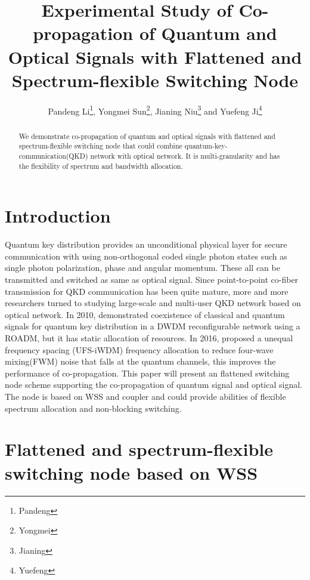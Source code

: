 \documentclass[letterpaper,10pt]{article}
\begin{document}
\title{Experimental Study of Co-propagation of Quantum and Optical Signals with Flattened and Spectrum-flexible Switching Node}
\author{Pandeng Li\thanks{Pandeng}, Yongmei Sun\thanks{Yongmei}, Jianing Niu\thanks{Jianing} and Yuefeng Ji\thanks{Yuefeng}}
\address{State Key Laboratory of Information Photonics and Optical Communications, School of Information and Telecommunication Engineering, BUPT Beijing, China, 100876}

\begin{abstract}
We demonstrate co-propagation of quantum and optical signals with flattened and spectrum-flexible switching node that could combine quantum-key-communication(QKD) network with optical network. It is multi-granularity and has the flexibility of spectrum and bandwidth allocation.
\end{abstract}

\section{Introduction}

Quantum key distribution provides an unconditional physical layer for secure communication with using non-orthogonal coded single photon states such as single photon polarization, phase and angular momentum. These all can be transmitted and switched as same as optical signal. Since point-to-point co-fiber transmission for QKD communication has been quite mature, more and more researchers turned to studying large-scale and multi-user QKD network based on optical network. In 2010, \cite{Peters} demonstrated coexistence of classical and quantum signals for quantum key distribution in a DWDM reconfigurable network using a ROADM, but it has static allocation of resources. In 2016, \cite{YongmeiSun} proposed a unequal frequency spacing (UFS-iWDM) frequency allocation to reduce four-wave mixing(FWM) noise that falls at the quantum channels, this improves the performance of co-propagation. This paper will present an flattened switching node scheme supporting the co-propagation of quantum signal and optical signal. The node is based on WSS and coupler and could provide abilities of flexible spectrum allocation and non-blocking switching.

\section{Flattened and spectrum-flexible switching node based on WSS}
\end{document}
